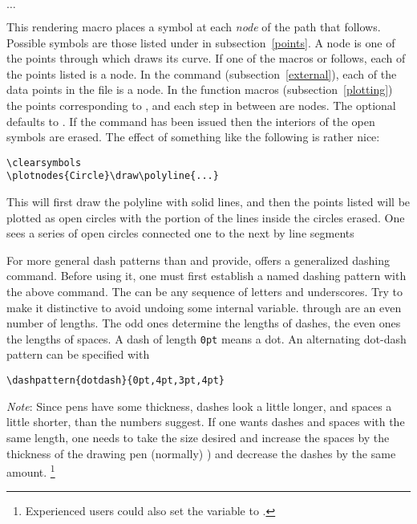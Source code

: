 \documentclass[letterpaper]{article}
\begin{document}
\begin{cd}
$\ldots$%
\end{cd}

This rendering macro places a symbol at each \emph{node} of the path
that follows. Possible symbols are those listed under  in
subsection~\ref{points}. A node is one of the points through which \MF{}
draws its curve.  If one of the macros \marg{$\ldots$} or
\marg{$\ldots$} follows, each of the points listed is a node.
In the  command (subsection~\ref{external}), each of the
data points in the file is a node. In the function macros
(subsection~\ref{plotting}) the points corresponding to ,
 and each step in between are nodes. The optional 
defaults to . If the command  has been
issued then the interiors of the open symbols are erased. The effect of
something like the following is rather nice:
\begin{verbatim}
\clearsymbols
\plotnodes{Circle}\draw\polyline{...}
\end{verbatim}
This will first draw the polyline with solid lines, and then the points
listed will be plotted as open circles with the portion of the lines
inside the circles erased. One sees a series of open circles connected
one to the next by line segments


\begin{cd}
%
\end{cd}

For more general dash patterns than  and  provide,
\mfp{} offers a generalized dashing command. Before using it, one must
first establish a named dashing pattern with the above command. The
 can be any sequence of letters and underscores. Try to make
it distinctive to avoid undoing some internal variable. 
through  are an even number of lengths. The odd ones
determine the lengths of dashes, the even ones the lengths of spaces. A
dash of length \texttt{0pt} means a dot. An alternating dot-dash pattern
can be specified with
\begin{verbatim}
\dashpattern{dotdash}{0pt,4pt,3pt,4pt}
\end{verbatim}
\emph{Note}: Since pens have some thickness, dashes look a little
longer, and spaces a little shorter, than the numbers suggest. If one
wants dashes and spaces with the same length, one needs to take the size
desired and increase the spaces by the thickness of the drawing pen
(normally) \dim{0.5pt}) and decrease the dashes by the same amount.%
    \footnote{Experienced \MP{} users could also set the 
    variable to .}
\end{document}
